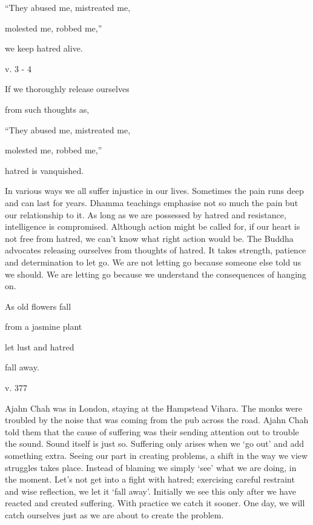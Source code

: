 \documentclass[a4paper,portrait,12pt]{article}
\begin{document}
``They abused me, mistreated me, 


molested me, robbed me,''


we keep hatred alive.





v. 3 - 4





If we thoroughly release ourselves 


from such thoughts as,


``They abused me, mistreated me, 


molested me, robbed me,''


hatred is vanquished.





In various ways we all suffer injustice in our lives. Sometimes the pain runs deep and can last for years. Dhamma teachings emphasise not so much the pain but our relationship to it. As long as we are possessed by hatred and resistance, intelligence is compromised. Although action might be called for, if our heart is not free from hatred, we can't know what right action would be. The Buddha advocates releasing ourselves from thoughts of hatred. It takes strength, patience and determination to let go. We are not letting go because someone else told us we should. We are letting go because we understand the consequences of hanging on.














As old flowers fall 


from a jasmine plant


let lust and hatred


fall away.





v. 377





Ajahn Chah was in London, staying at the Hampstead Vihara. The monks were troubled by the noise that was coming from the pub across the road. Ajahn Chah told them that the cause of suffering was their sending attention out to trouble the sound. Sound itself is just so. Suffering only arises when we `go out' and add something extra. Seeing our part in creating problems, a shift in the way we view struggles takes place. Instead of blaming we simply `see' what we are doing, in the moment. Let's not get into a fight with hatred; exercising careful restraint and wise reflection, we let it `fall away'. Initially we see this only after we have reacted and created suffering. With practice we catch it sooner. One day, we will catch ourselves just as we are about to create the problem.
\end{document}
